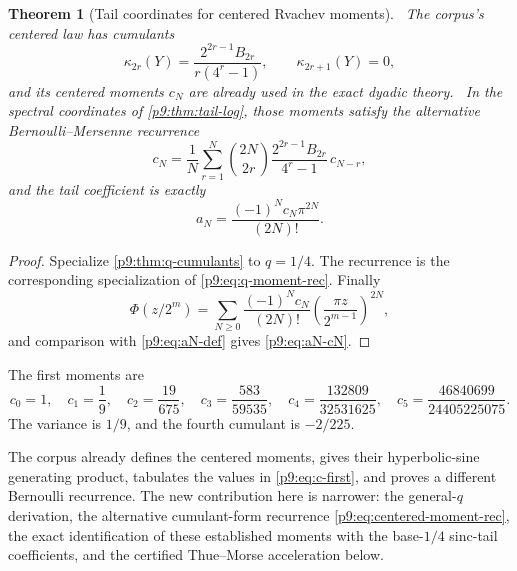 \documentclass[11pt]{article}
\numberwithin{equation}{section}
\newtheorem{theorem}{Theorem}[section]
\theoremstyle{definition}
\theoremstyle{remark}
\begin{document}
\begin{theorem}[Tail coordinates for centered Rvachev moments]\label{p9:thm:centered-cumulants}
\statusE\ The corpus's centered law has cumulants
\begin{equation}
 \boxed{
 \kappa_{2r}(Y)=\frac{2^{2r-1}B_{2r}}{r(4^r-1)},
 \qquad \kappa_{2r+1}(Y)=0,}                               \label{p9:eq:centered-cumulants}
\end{equation}
and its centered moments $c_N$ are already used in the exact dyadic theory.
\statusN\ In the spectral coordinates of \cref{p9:thm:tail-log}, those moments satisfy the
alternative Bernoulli--Mersenne recurrence
\begin{equation}
 \boxed{
 c_N=\frac1N\sum_{r=1}^{N}\binom{2N}{2r}
 \frac{2^{2r-1}B_{2r}}{4^r-1}\,c_{N-r},}                 \label{p9:eq:centered-moment-rec}
\end{equation}
and the tail coefficient is exactly
\begin{equation}
 \boxed{a_N=\frac{(-1)^Nc_N\pi^{2N}}{(2N)!}.}             \label{p9:eq:aN-cN}
\end{equation}
\end{theorem}

\begin{proof}
Specialize \cref{p9:thm:q-cumulants} to $q=1/4$.  The recurrence is the corresponding
specialization of \eqref{p9:eq:q-moment-rec}.  Finally
\[
 \Phi(z/2^m)=\sum_{N\ge0}\frac{(-1)^Nc_N}{(2N)!}
 \left(\frac{\pi z}{2^{m-1}}\right)^{2N},
\]
and comparison with \eqref{p9:eq:aN-def} gives \eqref{p9:eq:aN-cN}.
\end{proof}

The first moments are
\begin{equation}
 c_0=1,
 \quad c_1=\frac19,
 \quad c_2=\frac{19}{675},
 \quad c_3=\frac{583}{59535},
 \quad c_4=\frac{132809}{32531625},
 \quad c_5=\frac{46840699}{24405225075}.                   \label{p9:eq:c-first}
\end{equation}
The variance is $1/9$, and the fourth cumulant is $-2/225$.

\begin{remark}
The corpus already defines the centered moments, gives their hyperbolic-sine generating
product, tabulates the values in \eqref{p9:eq:c-first}, and proves a different Bernoulli
recurrence.  The new contribution here is narrower: the general-$q$ derivation, the
alternative cumulant-form recurrence \eqref{p9:eq:centered-moment-rec}, the exact identification
of these established moments with the base-$1/4$ sinc-tail coefficients, and the certified
Thue--Morse acceleration below.
\end{remark}
\end{document}
